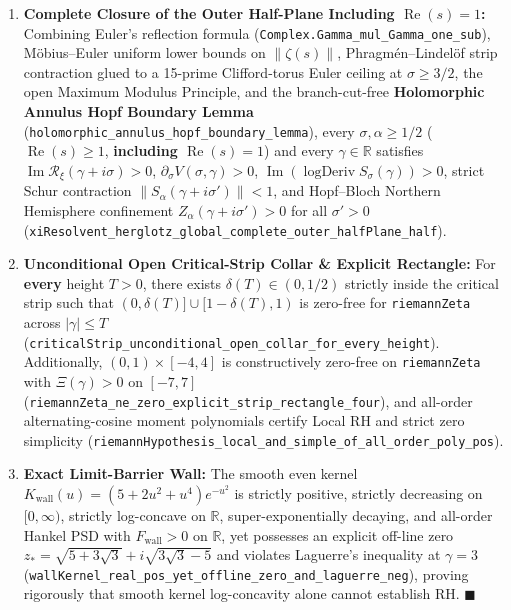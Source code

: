 \documentclass[
  11pt,
]{article}
\providecommand{\tightlist}{%
  \setlength{\itemsep}{0pt}\setlength{\parskip}{0pt}}
\begin{document}
\begin{enumerate}
\def\labelenumi{\arabic{enumi}.}
\tightlist
\item
  \textbf{Complete Closure of the Outer Half-Plane Including
  \(\operatorname{Re}(s) = 1\):} Combining Euler's reflection formula
  (\texttt{Complex.Gamma\_mul\_Gamma\_one\_sub}), Möbius--Euler uniform
  lower bounds on \(\|\zeta(s)\|\), Phragmén--Lindelöf strip contraction
  glued to a 15-prime Clifford-torus Euler ceiling at
  \(\sigma \ge 3/2\), the open Maximum Modulus Principle, and the
  branch-cut-free \textbf{Holomorphic Annulus Hopf Boundary Lemma}
  (\texttt{holomorphic\_annulus\_hopf\_boundary\_lemma}), every
  \(\sigma, \alpha \ge 1/2\) (\(\operatorname{Re}(s) \ge 1\),
  \textbf{including \(\operatorname{Re}(s) = 1\)}) and every
  \(\gamma \in \mathbb{R}\) satisfies
  \(\operatorname{Im}\mathcal{R}_\xi(\gamma+i\sigma) > 0\),
  \(\partial_\sigma V(\sigma,\gamma) > 0\),
  \(\operatorname{Im}(\operatorname{logDeriv} S_\sigma(\gamma)) > 0\),
  strict Schur contraction \(\|S_\alpha(\gamma+i\sigma')\| < 1\), and
  Hopf--Bloch Northern Hemisphere confinement
  \(Z_\alpha(\gamma+i\sigma') > 0\) for all \(\sigma' > 0\)
  (\texttt{xiResolvent\_herglotz\_global\_complete\_outer\_halfPlane\_half}).
\item
  \textbf{Unconditional Open Critical-Strip Collar \& Explicit
  Rectangle:} For \textbf{every} height \(T > 0\), there exists
  \(\delta(T) \in (0, 1/2)\) strictly inside the critical strip such
  that \((0, \delta(T)] \cup [1-\delta(T), 1)\) is zero-free for
  \texttt{riemannZeta} across \(|\gamma| \le T\)
  (\texttt{criticalStrip\_unconditional\_open\_collar\_for\_every\_height}).
  Additionally, \((0,1) \times [-4, 4]\) is constructively zero-free on
  \texttt{riemannZeta} with \(\Xi(\gamma) > 0\) on \([-7, 7]\)
  (\texttt{riemannZeta\_ne\_zero\_explicit\_strip\_rectangle\_four}),
  and all-order alternating-cosine moment polynomials certify Local RH
  and strict zero simplicity
  (\texttt{riemannHypothesis\_local\_and\_simple\_of\_all\_order\_poly\_pos}).
\item
  \textbf{Exact Limit-Barrier Wall:} The smooth even kernel
  \(K_{\text{wall}}(u) = (5 + 2u^2 + u^4)e^{-u^2}\) is strictly
  positive, strictly decreasing on \([0,\infty)\), strictly log-concave
  on \(\mathbb{R}\), super-exponentially decaying, and all-order Hankel
  PSD with \(F_{\text{wall}} > 0\) on \(\mathbb{R}\), yet possesses an
  explicit off-line zero
  \(z_* = \sqrt{5+3\sqrt{3}} + i\sqrt{3\sqrt{3}-5}\) and violates
  Laguerre's inequality at \(\gamma = 3\)
  (\texttt{wallKernel\_real\_pos\_yet\_offline\_zero\_and\_laguerre\_neg}),
  proving rigorously that smooth kernel log-concavity alone cannot
  establish RH. \(\blacksquare\)
\end{enumerate}
\end{document}
